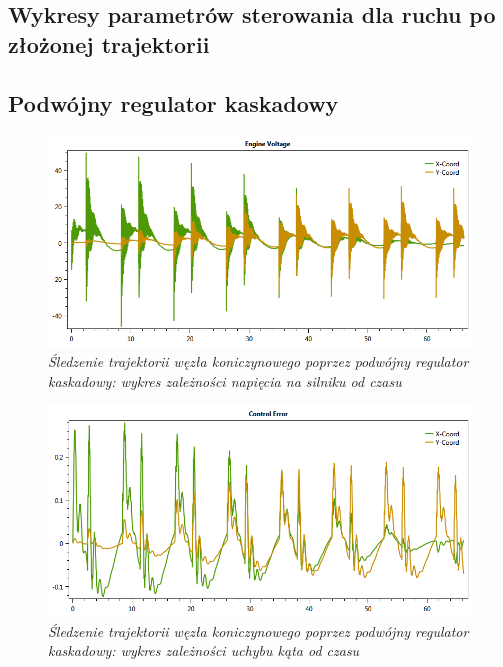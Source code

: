 \documentclass[12pt, twoside, openany]{report}
\theoremstyle{definition}
\begin{document}
\appendix
\begin{appendices}
  \chapter{Wykresy parametrów sterowania dla ruchu po złożonej trajektorii}
\label{appenix:A}
  
\section{Podwójny regulator kaskadowy}
\begin{figure}[H]
	\centering
		\includegraphics[width = 400pt]{TrefoilKnotCascadeEV} 
		\caption{\textit{Śledzenie trajektorii węzła koniczynowego poprzez podwójny regulator kaskadowy: wykres zależności napięcia na silniku od czasu}}
		\label{plot:TrefoilKnotCascadeEV}
\end{figure}

\begin{figure}[H]
	\centering
		\includegraphics[width = 400pt]{TrefoilKnotCascadeCE} 
		\caption{\textit{Śledzenie trajektorii węzła koniczynowego poprzez podwójny regulator kaskadowy: wykres zależności uchybu kąta od czasu}}
		\label{plot:TrefoilKnotCascadeCE}
\end{figure}


\end{appendices}
\end{document}
